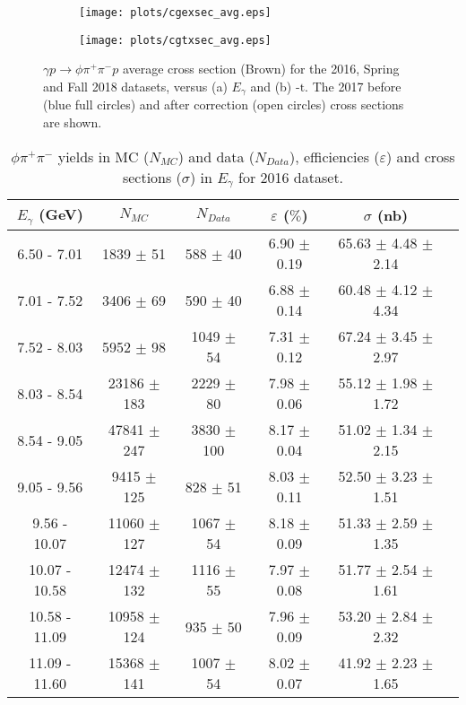 \begin{figure}[H]
    \centering
    \begin{subfigure}[b]{0.5\textwidth}
        \texttt{[image: plots/cgexsec\_avg.eps]}
        \caption{}
        \label{fig.y2175.xsec_ul.phi2pi.11.a}
    \end{subfigure}\hfill
    \begin{subfigure}[b]{0.5\textwidth}
        \texttt{[image: plots/cgtxsec\_avg.eps]}
        \caption{}
        \label{fig.y2175.xsec_ul.phi2pi.11.b}
    \end{subfigure}
    \caption{\label{fig.y2175.xsec_ul.phi2pi.11}$\gamma p \rightarrow \phi \pi^{+} \pi^{-} p$ average cross section (Brown) for the 2016, Spring and Fall 2018 datasets, versus (a) $E_{\gamma}$ and (b) $\mbox{-t}$. The 2017 before (blue full circles) and after correction (open circles) cross sections are shown.}
\end{figure}

\begin{center}
\begin{table}[h]
    \caption{$\phi \pi^{+}\pi^{-}$ yields in MC ($N_{MC}$) and data ($N_{Data}$), efficiencies ($\varepsilon$) and cross sections ($\sigma$) in $E_{\gamma}$ for 2016 dataset.}
    \label{tab.y2175.xsec_ul.phi2pi.1.1}
    \begin{tabular}{|c|c|c|c|c|c|}
    \hline
    $E_{\gamma}$ (GeV) & $N_{MC}$ & $N_{Data}$ & $\varepsilon$ ($\%$) & $\sigma$ (nb) \\ 
    \hline
   6.50 - 7.01 & 1839 $\pm$ 51 & 588 $\pm$ 40 & 6.90 $\pm$ 0.19 & 65.63 $\pm$ 4.48 $\pm$ 2.14 \\ 
   7.01 - 7.52 & 3406 $\pm$ 69 & 590 $\pm$ 40 & 6.88 $\pm$ 0.14 & 60.48 $\pm$ 4.12 $\pm$ 4.34 \\ 
   7.52 - 8.03 & 5952 $\pm$ 98 & 1049 $\pm$ 54 & 7.31 $\pm$ 0.12 & 67.24 $\pm$ 3.45 $\pm$ 2.97 \\ 
   8.03 - 8.54 & 23186 $\pm$ 183 & 2229 $\pm$ 80 & 7.98 $\pm$ 0.06 & 55.12 $\pm$ 1.98 $\pm$ 1.72 \\ 
   8.54 - 9.05 & 47841 $\pm$ 247 & 3830 $\pm$ 100 & 8.17 $\pm$ 0.04 & 51.02 $\pm$ 1.34 $\pm$ 2.15 \\ 
   9.05 - 9.56 & 9415 $\pm$ 125 & 828 $\pm$ 51 & 8.03 $\pm$ 0.11 & 52.50 $\pm$ 3.23 $\pm$ 1.51 \\ 
   9.56 - 10.07 & 11060 $\pm$ 127 & 1067 $\pm$ 54 & 8.18 $\pm$ 0.09 & 51.33 $\pm$ 2.59 $\pm$ 1.35 \\ 
   10.07 - 10.58 & 12474 $\pm$ 132 & 1116 $\pm$ 55 & 7.97 $\pm$ 0.08 & 51.77 $\pm$ 2.54 $\pm$ 1.61 \\ 
   10.58 - 11.09 & 10958 $\pm$ 124 & 935 $\pm$ 50 & 7.96 $\pm$ 0.09 & 53.20 $\pm$ 2.84 $\pm$ 2.32 \\ 
   11.09 - 11.60 & 15368 $\pm$ 141 & 1007 $\pm$ 54 & 8.02 $\pm$ 0.07 & 41.92 $\pm$ 2.23 $\pm$ 1.65 \\ 
   \hline
\end{tabular}
\end{table}
\end{center}

